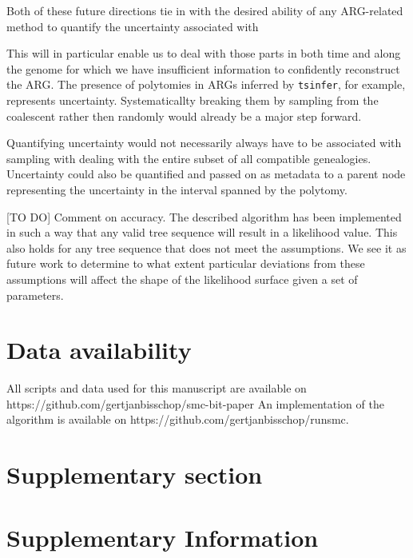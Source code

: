 \documentclass{article}
\newcommand{\tsinfer}[0]{\texttt{tsinfer}}
\newcommand{\supplementarysection}{%
  \setcounter{figure}{0}%
  \let\oldthefigure\thefigure%
  \renewcommand{\thefigure}{S\oldthefigure}%
  \section{Supplementary section}%
}
\begin{document}
Both of these future directions tie in with the desired ability of any ARG-related method to 
quantify the uncertainty associated with 



This will in particular enable us to deal with those 
parts in both time and along the genome for which we have insufficient information to confidently 
reconstruct the ARG. The presence of polytomies in ARGs inferred by \tsinfer, for example, 
represents uncertainty. Systematicallty breaking them by sampling from the coalescent rather 
then randomly would already be a major step forward. 


Quantifying uncertainty would not necessarily always have to be associated 
with sampling 
with dealing with the entire subset of all compatible genealogies. Uncertainty could also 
be quantified and passed on as metadata to a parent node representing the uncertainty 
in the interval spanned by the polytomy.

[TO DO] Comment on accuracy. The described algorithm has been implemented in such a way that 
any valid tree sequence will result in a likelihood value. This also holds for any tree sequence 
that does not meet the assumptions. We see it as future work to determine to what extent 
particular deviations from these assumptions will affect the shape of the likelihood surface given 
a set of parameters.



\section{Data availability}

All scripts and data used for this manuscript are available on https://github.com/gertjanbisschop/smc-bit-paper
An implementation of the algorithm is available on https://github.com/gertjanbisschop/runsmc.
\FloatBarrier



\pagebreak 

\supplementarysection
\section*{Supplementary Information}
\end{document}

